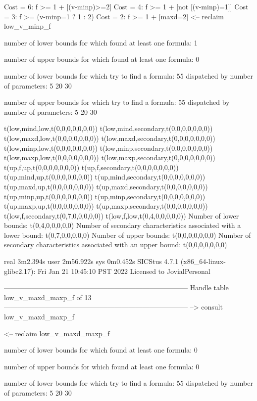 Cost =  6:  f >= 1 + [(v-minp)>=2]
Cost =  4:  f >= 1 + [not [(v-minp)=1]]
Cost =  3:  f >= (v-minp=1 ? 1 : 2)
Cost =  2:  f >= 1 + [maxd=2]
<-- reclaim low_v_minp_f

number of lower bounds for which found at least one formula: 1

number of upper bounds for which found at least one formula: 0

number of lower bounds for which try to find a formula: 55
dispatched by number of parameters: 5  20  30

number of upper bounds for which try to find a formula: 55
dispatched by number of parameters: 5  20  30

t(low,mind,low,t(0,0,0,0,0,0,0))
t(low,mind,secondary,t(0,0,0,0,0,0,0))
t(low,maxd,low,t(0,0,0,0,0,0,0))
t(low,maxd,secondary,t(0,0,0,0,0,0,0))
t(low,minp,low,t(0,0,0,0,0,0,0))
t(low,minp,secondary,t(0,0,0,0,0,0,0))
t(low,maxp,low,t(0,0,0,0,0,0,0))
t(low,maxp,secondary,t(0,0,0,0,0,0,0))
t(up,f,up,t(0,0,0,0,0,0,0))
t(up,f,secondary,t(0,0,0,0,0,0,0))
t(up,mind,up,t(0,0,0,0,0,0,0))
t(up,mind,secondary,t(0,0,0,0,0,0,0))
t(up,maxd,up,t(0,0,0,0,0,0,0))
t(up,maxd,secondary,t(0,0,0,0,0,0,0))
t(up,minp,up,t(0,0,0,0,0,0,0))
t(up,minp,secondary,t(0,0,0,0,0,0,0))
t(up,maxp,up,t(0,0,0,0,0,0,0))
t(up,maxp,secondary,t(0,0,0,0,0,0,0))
t(low,f,secondary,t(0,7,0,0,0,0,0))
t(low,f,low,t(0,4,0,0,0,0,0))
Number of lower bounds:                                             t(0,4,0,0,0,0,0)
Number of secondary characteristics associated with a lower bound:  t(0,7,0,0,0,0,0)
Number of upper bounds:                                             t(0,0,0,0,0,0,0)
Number of secondary characteristics associated with an upper bound: t(0,0,0,0,0,0,0)

real	3m2.394s
user	2m56.922s
sys	0m0.452s
SICStus 4.7.1 (x86_64-linux-glibc2.17): Fri Jan 21 10:45:10 PST 2022
Licensed to JovialPersonal


--------------------------------------------------------------------------------
Handle table low_v_maxd_maxp_f of 13
--------------------------------------------------------------------------------
--> consult low_v_maxd_maxp_f

<-- reclaim low_v_maxd_maxp_f

number of lower bounds for which found at least one formula: 0

number of upper bounds for which found at least one formula: 0

number of lower bounds for which try to find a formula: 55
dispatched by number of parameters: 5  20  30


